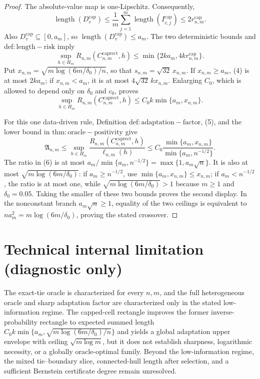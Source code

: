 \documentclass{article}
\begin{document}
\begin{proof}
The absolute-value map is one-Lipschitz. Consequently,
\[
 \operatorname{length}(D^{\mathrm{cap}}_v)
 \leq\frac1m\sum_{j=1}^{m}\operatorname{length}(I^{\mathrm{cap}}_{v,j})
 \leq2r^{\mathrm{cap}}_{n,m}.                                           \tag{3}
\]
Also \(D^{\mathrm{cap}}_v\subseteq[0,a_m]\), so \(\operatorname{length}(D^{\mathrm{cap}}_v)\leq a_m\). The two deterministic bounds and \(\mathrm{def:length-risk}\) imply
\[
 \sup_{h\in H_m}R_{n,m}(C^{\mathrm{caprect}}_{n,m},h)
 \leq\min\{2ka_m,4kr^{\mathrm{cap}}_{n,m}\}.                            \tag{4}
\]
Put \(x_{n,m}=\sqrt{m\log(6m/\delta_0)/n}\), so that \(s_{n,m}=\sqrt{32}\,x_{n,m}\). If \(x_{n,m}\geq a_m\), (4) is at most \(2ka_m\); if \(x_{n,m}<a_m\), it is at most \(4\sqrt{32}\,k x_{n,m}\). Enlarging \(C_0\), which is allowed to depend only on \(\delta_0\) and \(c_0\), proves
\[
 \sup_{h\in H_m}R_{n,m}(C^{\mathrm{caprect}}_{n,m},h)
 \leq C_0k\min\{a_m,x_{n,m}\}.                                        \tag{5}
\]

For this one data-driven rule, Definition \(\mathrm{def:adaptation-factor}\), (5), and the lower bound in \(\mathrm{thm:oracle-positivity}\) give
\[
 \mathfrak A_{n,m}
 \leq\sup_{h\in H_m}\frac{R_{n,m}(C^{\mathrm{caprect}}_{n,m},h)}{\ell_{n,m}(h)}
 \leq C_0\frac{\min\{a_m,x_{n,m}\}}{\min\{a_m,n^{-1/2}\}}.          \tag{6}
\]
The ratio in (6) is at most \(a_m/\min\{a_m,n^{-1/2}\}=\max\{1,a_m\sqrt n\}\). It is also at most \(\sqrt{m\log(6m/\delta_0)}\): if \(a_m\geq n^{-1/2}\), use \(\min\{a_m,x_{n,m}\}\leq x_{n,m}\); if \(a_m<n^{-1/2}\), the ratio is at most one, while \(\sqrt{m\log(6m/\delta_0)}>1\) because \(m\geq1\) and \(\delta_0=0.05\). Taking the smaller of these two bounds proves the second display. In the nonconstant branch \(a_m\sqrt n\geq1\), equality of the two ceilings is equivalent to \(na_m^2=m\log(6m/\delta_0)\), proving the stated crossover.
\end{proof}

\section*{Technical internal limitation (diagnostic only)}

The exact-tie oracle is characterized for every \(n,m\), and the full heterogeneous oracle and sharp adaptation factor are characterized only in the stated low-information regime. The capped-cell rectangle improves the former inverse-probability rectangle to expected summed length \(C_0k\min\{a_m,\sqrt{m\log(6m/\delta_0)/n}\}\) and yields a global adaptation upper envelope with ceiling \(\sqrt{m\log m}\), but it does not establish sharpness, logarithmic necessity, or a globally oracle-optimal family. Beyond the low-information regime, the mixed tie--boundary slice, connected-hull length after selection, and a sufficient Bernstein certificate degree remain unresolved.
\end{document}
